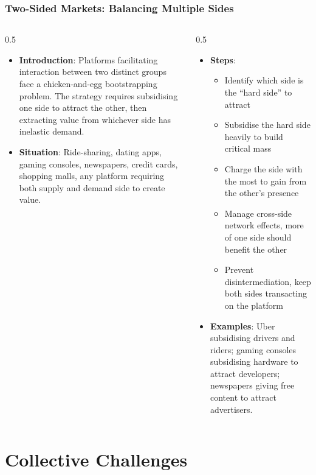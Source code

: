 \begin{frame}[fragile]\frametitle{Two-Sided Markets: Balancing Multiple Sides}
\begin{columns}
    \begin{column}[T]{0.5\linewidth}
      \begin{itemize}
        \item \textbf{Introduction}: Platforms facilitating interaction between two distinct groups face a chicken-and-egg bootstrapping problem. The strategy requires subsidising one side to attract the other, then extracting value from whichever side has inelastic demand.
        \item \textbf{Situation}: Ride-sharing, dating apps, gaming consoles, newspapers, credit cards, shopping malls, any platform requiring both supply and demand side to create value.
      \end{itemize}
    \end{column}
    \begin{column}[T]{0.5\linewidth}
      \begin{itemize}
        \item \textbf{Steps}:
        \begin{itemize}
          \item Identify which side is the ``hard side'' to attract
          \item Subsidise the hard side heavily to build critical mass
          \item Charge the side with the most to gain from the other's presence
          \item Manage cross-side network effects, more of one side should benefit the other
          \item Prevent disintermediation, keep both sides transacting on the platform
        \end{itemize}\item \textbf{Examples}: Uber subsidising drivers and riders; gaming consoles subsidising hardware to attract developers; newspapers giving free content to attract advertisers.
      \end{itemize}
    \end{column}
  \end{columns}
\end{frame}


\section{Collective Challenges}

